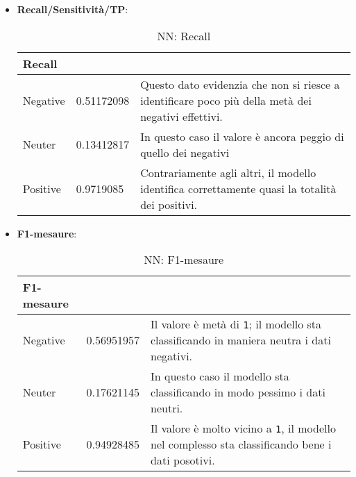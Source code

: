 \begin{itemize}
				\item \textbf{Recall/Sensitività/TP}:
				
				\begin{table} [H]
					\caption{NN: Recall}
					\label{tab:RecallNN}
					\centering
					\begin{tabular}{llp{}}
						\toprule 
						\textbf{Recall}	\\
						\midrule
						Negative  & 0.51172098  & Questo dato evidenzia che non si riesce a identificare poco più della metà dei negativi effettivi.\\
						Neuter & 0.13412817 & In questo caso il valore è ancora peggio di quello dei negativi\\
						Positive & 0.9719085 & Contrariamente agli altri, il modello identifica correttamente quasi la totalità dei positivi.\\
						\bottomrule
					\end{tabular}
				\end{table}
				\item \textbf{F1-mesaure}:
				
				\begin{table} [H]
					\caption{NN: F1-mesaure}
					\label{tab:F1-mesaureNN}
					\centering
					\begin{tabular}{llp{}}
						\toprule 
						\textbf{F1-mesaure}	\\
						\midrule
						Negative  & 0.56951957  & Il valore è metà di \verb|1|; il modello sta classificando in maniera neutra i dati negativi.\\
						Neuter & 0.17621145 & In questo caso il modello sta classificando in modo pessimo i dati neutri.\\
						Positive & 0.94928485 & Il valore è molto vicino a \verb|1|, il modello nel complesso sta classificando bene i dati posotivi.\\
						\bottomrule
					\end{tabular}
				\end{table}
		\end{itemize}
		
